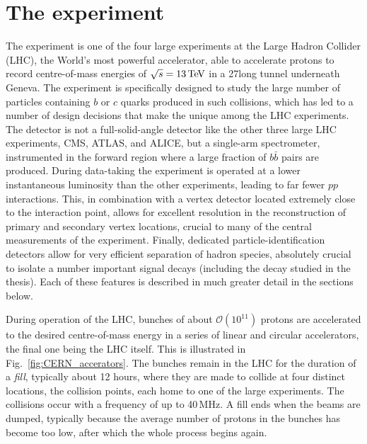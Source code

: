 

\chapter{The \lhcb experiment}
\label{ch:3-detector}


The \lhcb experiment is one of the four large experiments at the Large Hadron Collider (LHC), the World's most powerful accelerator, able to accelerate protons to record centre-of-mass energies of $\sqrt{s}=13\text{\,Te\kern -0.1em V}$ in a 27\km long tunnel underneath Geneva. The \lhcb experiment is specifically designed to study the large number of particles containing $b$ or $c$ quarks produced in such collisions, which has led to a number of design decisions that make the \lhcb unique among the LHC experiments. The \lhcb detector is not a full-solid-angle detector like the other three large LHC experiments, CMS, ATLAS, and ALICE, but a single-arm spectrometer, instrumented in the forward region where a large fraction of $b\bar b$ pairs are produced. During data-taking the experiment is operated at a lower instantaneous luminosity than the other experiments, leading to far fewer $pp$ interactions. This, in combination with a vertex detector located extremely close to the interaction point, allows for excellent resolution in the reconstruction of primary and secondary vertex locations, crucial to many of the central measurements of the experiment. Finally, dedicated particle-identification detectors allow for very efficient separation of hadron species, absolutely crucial to isolate a number important signal decays (including the \BtoDK decay studied in the thesis). Each of these features is described in much greater detail in the sections below.



During operation of the LHC, bunches of about $\mathcal O(10^{11})$ protons are accelerated to the desired centre-of-mass energy in a series of linear and circular accelerators, the final one being the LHC itself. This is illustrated in Fig.~\ref{fig:CERN_accerators}. The bunches remain in the LHC for the duration of a \emph{fill}, typically about 12 hours, where they are made to collide at four distinct locations, the collision points, each home to one of the large experiments. The collisions occur with a frequency of up to 40\,MHz. A fill ends when the beams are dumped, typically because the average number of protons in the bunches has become too low, after which the whole process begins again.

